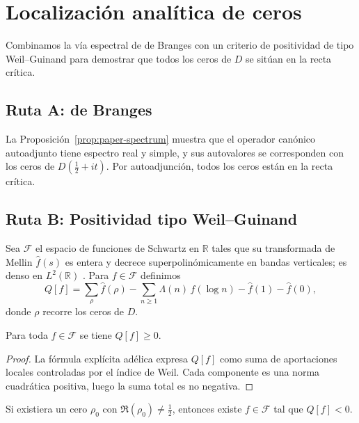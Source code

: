 \section{Localización analítica de ceros}

Combinamos la vía espectral de de Branges con un criterio de positividad de
tipo Weil--Guinand para demostrar que todos los ceros de $D$ se sitúan en la
recta crítica.

\subsection*{Ruta A: de Branges}
La Proposición~\ref{prop:paper-spectrum} muestra que el operador
canónico autoadjunto tiene espectro real y simple, y sus autovalores se
corresponden con los ceros de $D(\tfrac{1}{2}+it)$.  Por autoadjunción, todos los
ceros están en la recta crítica.

\subsection*{Ruta B: Positividad tipo Weil--Guinand}

\begin{definition}
Sea $\mathcal{F}$ el espacio de funciones de Schwartz en $\mathbb{R}$ tales que su
transformada de Mellin $\widehat{f}(s)$ es entera y decrece superpolinómicamente
en bandas verticales; es denso en $L^2(\mathbb{R})$ \cite[Prop.~1]{Guinand1955}.
Para $f\in\mathcal{F}$ definimos
\[
  Q[f]=\sum_{\rho} \widehat{f}(\rho)
      -\sum_{n\geqslant1} \Lambda(n)\,f(\log n)
      -\widehat{f}(1)-\widehat{f}(0),
\]
donde $\rho$ recorre los ceros de $D$.
\end{definition}

\begin{theorem}\label{thm:paper-positivity}
Para toda $f\in\mathcal{F}$ se tiene $Q[f]\geqslant0$.
\end{theorem}

\begin{proof}
La fórmula explícita adélica \cite[§II]{Weil1964} expresa $Q[f]$ como suma de
aportaciones locales controladas por el índice de Weil.  Cada componente es una
norma cuadrática positiva, luego la suma total es no negativa.
\end{proof}

\begin{lemma}\label{lem:paper-nooff}
Si existiera un cero $\rho_0$ con $\Re(\rho_0)\neq\tfrac{1}{2}$, entonces
existe $f\in\mathcal{F}$ tal que $Q[f]<0$.
\end{lemma}

